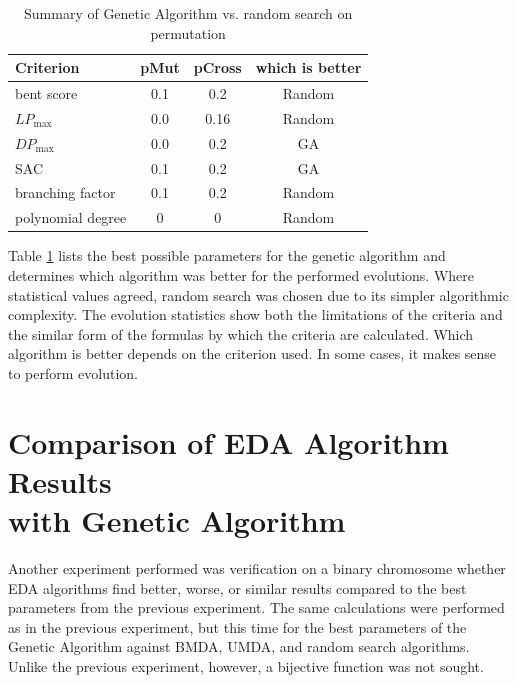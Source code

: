 \begin{table}[bt]
\begin{center}
\begin{tabular}{| l | c | c | c |}
\hline
Criterion & pMut & pCross & which is better \\ \hline
bent score & 0.1 & 0.2 & Random \\ \hline
$LP_{\max}$ & 0.0 & 0.16 & Random \\ \hline
$DP_{\max}$ & 0.0 & 0.2  & GA \\ \hline
SAC & 0.1 & 0.2 & GA \\ \hline
branching factor & 0.1 & 0.2 & Random \\ \hline
polynomial degree & 0 & 0 & Random \\ \hline
\end{tabular}
\caption{Summary of Genetic Algorithm vs. random search on permutation}
\label{tabGAvsRandom}
\end{center}
\end{table}

Table \ref{tabGAvsRandom} lists the best possible parameters for the genetic algorithm
and determines which algorithm was better for the performed evolutions.
Where statistical values agreed, random search was chosen due to its simpler
algorithmic complexity. The evolution statistics show both the limitations of the criteria
and the similar form of the formulas by which the criteria are calculated.
Which algorithm is better depends on the criterion used.
In some cases, it makes sense to perform evolution.

\section{Comparison of EDA Algorithm Results\\with Genetic Algorithm}
Another experiment performed was verification on a binary chromosome
whether EDA algorithms find better, worse, or similar results compared to the best parameters from the previous
experiment. The same calculations were performed as in the previous experiment, but this time for
the best parameters of the Genetic Algorithm against BMDA, UMDA, and random search algorithms.
Unlike the previous experiment, however, a bijective function was not sought.


